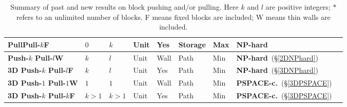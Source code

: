 \begin{table}
{\begin{tabular}{|l|l|l|l|l|l|l|l|l|}
PullPull-$k$F & $0$ & $k$ & Unit & Yes & Storage  & Max  & NP-hard\cite{Pull10} \\ \hline
\textbf{Push-$k$ Pull-$l$W} & $k$ & $l$ & Unit & Wall & Path  & Min & \textbf{NP-hard}\ (\S  \ref{2DNPhard}) \\ \hline
\textbf{3D Push-$k$ Pull-$l$F} & $k$ & $l$ & Unit & Yes & Path & Min &  \textbf{NP-hard}\ (\S  \ref{3DNPhard}) \\ \hline
\textbf{3D Push-$1$ Pull-$1$W} & $1$ & $1$ & Unit & Wall & Path & Min &  \textbf{PSPACE-c.}\ (\S  \ref{3DPSPACE}) \\ \hline
\textbf{3D Push-$k$ Pull-$k$F} & $k > 1$ & $k >1$ & Unit & Yes & Path & Min &  \textbf{PSPACE-c.}\ (\S  \ref{3DPSPACE}) \\ \hline
\end{tabular}
}
\caption{Summary of past and new results on block pushing and/or pulling. Here $k$ and $l$ are positive integers; $*$ refers to an unlimited number of blocks. F means fixed blocks are included; W means thin walls are included.} %
\label{BlocksTable}
\end{table}



